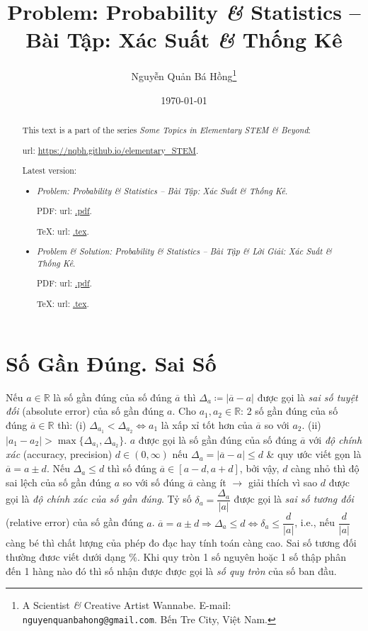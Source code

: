 \documentclass{article}
\title{Problem: Probability {\it\&} Statistics -- Bài Tập: Xác Suất {\it\&} Thống Kê}
\author{Nguyễn Quản Bá Hồng\footnote{A Scientist {\it\&} Creative Artist Wannabe. E-mail: {\tt nguyenquanbahong@gmail.com}. Bến Tre City, Việt Nam.}}
\date{\today}
\begin{document}
\maketitle
\begin{abstract}
	This text is a part of the series {\it Some Topics in Elementary STEM \& Beyond}:
	
	{\sc url}: \url{https://nqbh.github.io/elementary_STEM}.
	
	Latest version:
	\begin{itemize}
		\item {\it Problem: Probability \& Statistics -- Bài Tập: Xác Suất \& Thống Kê}.
		
		PDF: {\sc url}: \url{.pdf}.
		
		\TeX: {\sc url}: \url{.tex}.
		\item {\it Problem \& Solution: Probability \& Statistics -- Bài Tập \& Lời Giải: Xác Suất \& Thống Kê}.
		
		PDF: {\sc url}: \url{.pdf}.
		
		\TeX: {\sc url}: \url{.tex}.
	\end{itemize}
\end{abstract}
\tableofcontents


\section{Số Gần Đúng. Sai Số}
 Nếu $a\in\mathbb{R}$ là số gần đúng của số đúng $\overline{a}$ thì $\Delta_a\coloneqq|\overline{a} - a|$ được gọi là {\it sai số tuyệt đối} (absolute error) của số gần đúng $a$.  Cho $a_1,a_2\in\mathbb{R}$: 2 số gần đúng của số đúng $\overline{a}\in\mathbb{R}$ thì: (i) $\Delta_{a_1} < \Delta_{a_2}\Leftrightarrow a_1$ là xấp xỉ tốt hơn của $\overline{a}$ so với $a_2$. (ii) $|a_1 - a_2| > \max\{\Delta_{a_1},\Delta_{a_2}\}$.  $a$ được gọi là số gần đúng của số đúng $\overline{a}$ với {\it độ chính xác} (accuracy, precision) $d\in(0,\infty)$ nếu $\Delta_a = |\overline{a} - a|\le d$ \& quy ước viết gọn là $\overline{a} = a\pm d$.  Nếu $\Delta_a\le d$ thì số đúng $\overline{a}\in[a - d,a + d]$, bởi vậy, $d$ càng nhỏ thì độ sai lệch của số gần đúng $a$ so với số đúng $\overline{a}$ càng ít $\to$ giải thích vì sao $d$ được gọi là {\it độ chính xác của số gần đúng}.  Tỷ số $\delta_a = \dfrac{\Delta_a}{|a|}$ được gọi là {\it sai số tương đối} (relative error) của số gần đúng $a$.  $\overline{a} = a\pm d\Rightarrow\Delta_a\le d\Leftrightarrow\delta_a\le\dfrac{d}{|a|}$, i.e., nếu $\dfrac{d}{|a|}$ càng bé thì chất lượng của phép đo đạc hay tính toán càng cao. Sai số tương đối thường đươc viết dưới dạng \%.  Khi quy tròn 1 số nguyên hoặc 1 số thập phân đến 1 hàng nào đó thì số nhận được được gọi là {\it số quy tròn} của số ban đầu.
\end{document}
